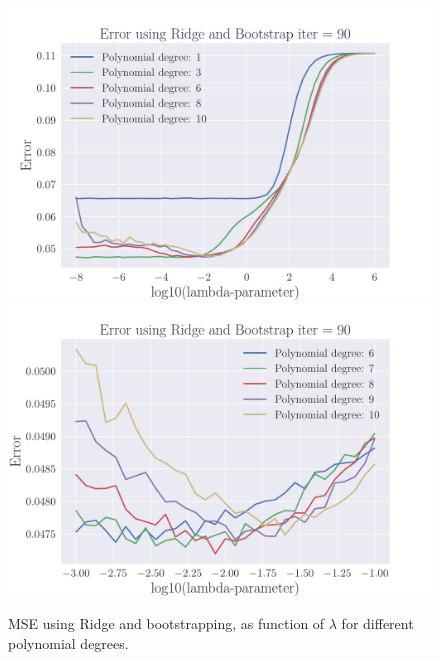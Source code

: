 \documentclass[reprint,english,notitlepage,aps,nobalancelastpage,nofootinbib]{revtex4-1}  %
\begin{document}
\begin{figure}[H]
	\includegraphics[width=\linewidth]{lambdaMSE_Ridge_Bootstrap90_n30_eps02_p10_lm8_6.pdf}
	\endminipage\hfill
	\includegraphics[width=\linewidth]{lambdaMSE_Ridge_Bootstrap90_n30_eps02_p10_lm3_m1.pdf}
	\endminipage
	\caption{MSE using Ridge and bootstrapping, as function of $\lambda$ for different polynomial degrees.}
	\label{fig:Ridge-boot_lambdas}
\end{figure}
\end{document}
